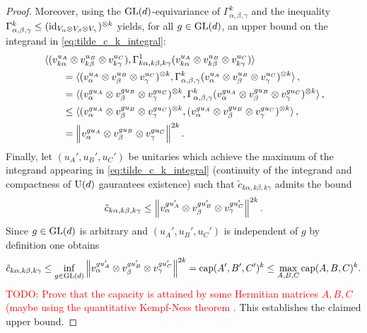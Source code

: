 \documentclass[notitlepage, 10pt]{article}
\begin{document}
\begin{proof}
    Moreover, using the $\operatorname{GL}(d)$-equivariance of $\Gamma_{\alpha,\beta,\gamma}^{k}$ and the inequality $\Gamma_{\alpha,\beta,\gamma}^{k} \leq (\operatorname{id}_{V_{\alpha}\otimes V_{\beta} \otimes V_{\gamma}})^{\otimes k}$ yields, for all $g \in \operatorname{GL}(d)$, an upper bound on the integrand in \cref{eq:tilde_c_k_integral}:    \begin{align}
        &\braket{(v_{k\alpha}^{u_A} \otimes v_{k\beta}^{u_B} \otimes v_{k\gamma}^{u_C}), \Gamma_{k\alpha,k\beta,k\gamma}^{1} (v_{k\alpha}^{u_A} \otimes v_{k\beta}^{u_B} \otimes v_{k\gamma}^{u_C})}\\
        &\qquad=\braket{(v_{\alpha}^{u_A} \otimes v_{\beta}^{u_B} \otimes v_{\gamma}^{u_C})^{\otimes k}, \Gamma_{\alpha,\beta,\gamma}^{k} (v_{\alpha}^{u_A} \otimes v_{\beta}^{u_B} \otimes v_{\gamma}^{u_C})^{\otimes k}}, \\
        &\qquad=\braket{(v_{\alpha}^{gu_A} \otimes v_{\beta}^{gu_B} \otimes v_{\gamma}^{gu_C})^{\otimes k}, \Gamma_{\alpha,\beta,\gamma}^{k} (v_{\alpha}^{gu_A} \otimes v_{\beta}^{gu_B} \otimes v_{\gamma}^{gu_C})^{\otimes k}}, \\
        &\qquad\leq\braket{(v_{\alpha}^{gu_A} \otimes v_{\beta}^{gu_B} \otimes v_{\gamma}^{gu_C})^{\otimes k}, (v_{\alpha}^{gu_A} \otimes v_{\beta}^{gu_B} \otimes v_{\gamma}^{gu_C})^{\otimes k}}, \\
        &\qquad= \left\lVert v_\alpha^{gu_A} \otimes v_\beta^{gu_B} \otimes v_\gamma^{gu_C}\right\rVert^{2k}.
    \end{align}
    Finally, let $(u_{A}',u_{B}',u_{C}')$ be unitaries which achieve the maximum of the integrand appearing in \cref{eq:tilde_c_k_integral} (continuity of the integrand and compactness of $\operatorname{U}(d)$ gaurantees existence) such that $\tilde c_{k\alpha,k\beta,k\gamma}$ admits the bound
    \begin{equation}
        \tilde c_{k\alpha, k\beta, k\gamma} \leq \left\lVert v_\alpha^{gu_A'} \otimes v_\beta^{gu_B'} \otimes v_\gamma^{gu_C'}\right\rVert^{2k}.
    \end{equation}
    Since $g \in \operatorname{GL}(d)$ is arbitrary and $(u_{A}',u_{B}',u_{C}')$ is independent of $g$ by definition one obtains
    \begin{equation}
        \tilde c_{k\alpha, k\beta, k\gamma} \leq \inf_{g \in \operatorname{GL}(d)} \left\lVert v_\alpha^{gu_A'} \otimes v_\beta^{gu_B'} \otimes v_\gamma^{gu_C'}\right\rVert^{2k} = \operatorname{cap}(A',B',C')^{k} \leq \max_{A,B,C}\operatorname{cap}(A,B,C)^{k}.
    \end{equation}
    \textcolor{red}{TODO: Prove that the capacity is attained by some Hermitian matrices $A,B,C$ (maybe using the quantitative Kempf-Ness theorem \cite[Theorem 1.17]{burgisser2019towards}.}
    This establishes the claimed upper bound.

\end{proof}
\end{document}
